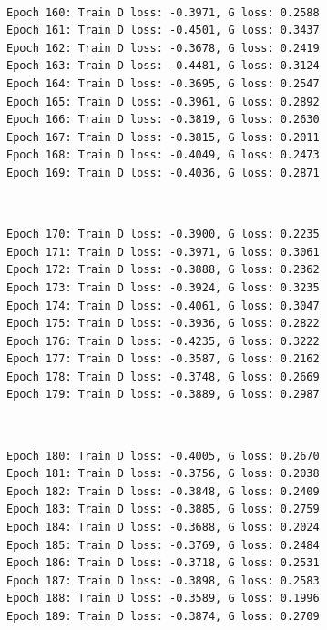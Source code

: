\documentclass[11pt]{article}
\begin{document}
    \begin{center}
    \end{center}
    { \hspace*{\fill} \\}
    
    \begin{Verbatim}[commandchars=\\\{\}]
Epoch 160: Train D loss: -0.3971, G loss: 0.2588
Epoch 161: Train D loss: -0.4501, G loss: 0.3437
Epoch 162: Train D loss: -0.3678, G loss: 0.2419
Epoch 163: Train D loss: -0.4481, G loss: 0.3124
Epoch 164: Train D loss: -0.3695, G loss: 0.2547
Epoch 165: Train D loss: -0.3961, G loss: 0.2892
Epoch 166: Train D loss: -0.3819, G loss: 0.2630
Epoch 167: Train D loss: -0.3815, G loss: 0.2011
Epoch 168: Train D loss: -0.4049, G loss: 0.2473
Epoch 169: Train D loss: -0.4036, G loss: 0.2871

    \end{Verbatim}

    \begin{center}
    \end{center}
    { \hspace*{\fill} \\}
    
    \begin{Verbatim}[commandchars=\\\{\}]
Epoch 170: Train D loss: -0.3900, G loss: 0.2235
Epoch 171: Train D loss: -0.3971, G loss: 0.3061
Epoch 172: Train D loss: -0.3888, G loss: 0.2362
Epoch 173: Train D loss: -0.3924, G loss: 0.3235
Epoch 174: Train D loss: -0.4061, G loss: 0.3047
Epoch 175: Train D loss: -0.3936, G loss: 0.2822
Epoch 176: Train D loss: -0.4235, G loss: 0.3222
Epoch 177: Train D loss: -0.3587, G loss: 0.2162
Epoch 178: Train D loss: -0.3748, G loss: 0.2669
Epoch 179: Train D loss: -0.3889, G loss: 0.2987

    \end{Verbatim}

    \begin{center}
    \end{center}
    { \hspace*{\fill} \\}
    
    \begin{Verbatim}[commandchars=\\\{\}]
Epoch 180: Train D loss: -0.4005, G loss: 0.2670
Epoch 181: Train D loss: -0.3756, G loss: 0.2038
Epoch 182: Train D loss: -0.3848, G loss: 0.2409
Epoch 183: Train D loss: -0.3885, G loss: 0.2759
Epoch 184: Train D loss: -0.3688, G loss: 0.2024
Epoch 185: Train D loss: -0.3769, G loss: 0.2484
Epoch 186: Train D loss: -0.3718, G loss: 0.2531
Epoch 187: Train D loss: -0.3898, G loss: 0.2583
Epoch 188: Train D loss: -0.3589, G loss: 0.1996
Epoch 189: Train D loss: -0.3874, G loss: 0.2709

    \end{Verbatim}
\end{document}
